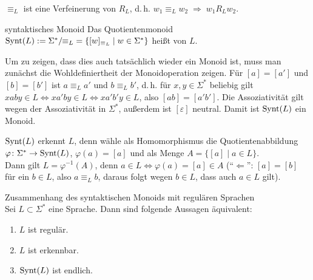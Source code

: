 \begin{Bem}
    $\equiv_L$ ist eine Verfeinerung von $R_L$, d.\,h.
    $w_1 \equiv_L w_2 \;\Rightarrow\; w_1 R_L w_2$.
\end{Bem}

\begin{Def}{syntaktisches Monoid}
    Das Quotientenmonoid $\text{Synt}(L) := \Sigma^\ast/\!\!\equiv_L \;=
    \{[w]_{\equiv_L} \;|\; w \in \Sigma^\ast\}$ heißt
     von $L$.
\end{Def}

\begin{Bem}
    Um zu zeigen, dass dies auch tatsächlich wieder ein Monoid ist,
    muss man zunächst die Wohldefiniertheit der Monoidoperation zeigen.
    Für $[a] = [a']$ und $[b] = [b']$ ist
    $a \equiv_L a'$ und $b \equiv_L b'$, d.\,h.
    für $x, y \in \Sigma^\ast$ beliebig gilt
    $x ab y \in L \iff x a'b y \in L \iff x a'b' y \in L$,
    also $[ab] = [a'b']$.
    Die Assoziativität gilt wegen der Assoziativität in $\Sigma^\ast$,
    außerdem ist $[\varepsilon]$ neutral.
    Damit ist $\text{Synt}(L)$ ein Monoid.
\end{Bem}

\begin{Bem}
    $\text{Synt}(L)$ erkennt $L$, denn
    wähle als Homomorphismus die Quotientenabbildung
    $\varphi\colon \Sigma^\ast \rightarrow \text{Synt}(L)$,
    $\varphi(a) = [a]$ und als Menge $A = \{[a] \;|\; a \in L\}$.\\
    Dann gilt $L = \varphi^{-1}(A)$, denn
    $a \in L \iff \varphi(a) = [a] \in A$
    ("`$\Leftarrow$"':
    $[a] = [b]$ für ein $b \in L$,
    also $a \equiv_L b$, daraus folgt wegen $b \in L$, dass auch $a \in L$
    gilt).
\end{Bem}

\linie

\begin{Satz}{Zusammenhang des syntaktischen Monoids mit regulären Sprachen}\\
    Sei $L \subset \Sigma^\ast$ eine Sprache.
    Dann sind folgende Aussagen äquivalent:
    \begin{enumerate}
        \item
        $L$ ist regulär.
        
        \item
        $L$ ist erkennbar.
        
        \item
        $\text{Synt}(L)$ ist endlich.
    \end{enumerate}
\end{Satz}

